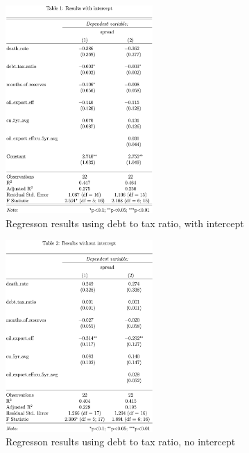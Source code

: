 \documentclass[11pt,]{article}
\begin{document}
\begin{figure}
\centering
\includegraphics[width=0.5\textwidth,height=\textheight]{reportfigures/BEFORE_Regression__ouputs_when_using_debt_tax_ratio_intercept.png}
\caption{Regresson results using debt to tax ratio, with intercept}
\end{figure}

\begin{figure}
\centering
\includegraphics[width=0.5\textwidth,height=\textheight]{reportfigures/BEFORE_Regression__ouputs_when_using_debt_tax_ratio_nointercept.png}
\caption{Regresson results using debt to tax ratio, no intercept}
\end{figure}
\end{document}
